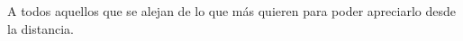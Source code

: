 \thispagestyle{empty}

\vspace*{3cm}

\begin{center}
    A todos aquellos que se alejan de lo que más quieren para poder apreciarlo desde la distancia.   
\end{center}
